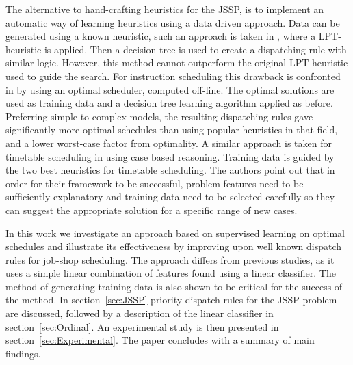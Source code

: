 \documentclass[10pt]{llncs}
\begin{document}

The alternative to hand-crafting heuristics for the JSSP, is to implement an automatic way of learning heuristics using a data driven approach. 
Data can be generated using a known heuristic, such an approach is taken in \cite{Li2005}, where a LPT-heuristic is applied. Then a decision tree is used to create a dispatching rule with similar logic. However, this method cannot outperform the original LPT-heuristic used to guide the search. For instruction scheduling this drawback is confronted in \cite{Malik2007,Russell2009} by using an optimal scheduler, computed off-line. The optimal solutions are used as training data and a decision tree learning algorithm applied as before. Preferring simple to complex models, the resulting dispatching rules gave significantly more optimal schedules than using popular heuristics in that field, and a lower worst-case factor from optimality. A similar approach is taken for timetable scheduling in \cite{Burke2006} using case based reasoning. Training data is guided by the two best heuristics for timetable scheduling. The  authors point out that in order for their framework to be successful, problem features need to be sufficiently explanatory and training data need to be selected carefully so they can suggest the appropriate solution for a specific range of new cases. 

In this work we investigate an approach based on supervised learning on optimal schedules and illustrate its effectiveness by improving upon well known dispatch rules for job-shop scheduling. The approach differs from previous studies, as it uses a simple linear combination of features found using a linear classifier. The method of generating training data is also shown to be critical for the success of the method. In section~\ref{sec:JSSP} priority dispatch rules for the JSSP problem are discussed, followed by a description of the linear classifier in section~\ref{sec:Ordinal}. An experimental study is then presented in section~\ref{sec:Experimental}. The paper concludes with a summary of main findings.
\end{document}
